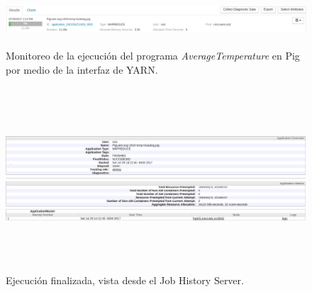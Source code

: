 \begin{figure}[H]
  \centering
      \includegraphics[width=\textwidth, height=0.8in]{fig/05/05}
  \caption{Monitoreo de la ejecución del programa \textit{AverageTemperature} en Pig por medio de la interfaz de YARN.}
\end{figure}

\begin{figure}[H]
  \centering
      \includegraphics[width=\textwidth, height=2.7in]{fig/05/06}
  \caption{Ejecución finalizada, vista desde el Job History Server.}
\end{figure}